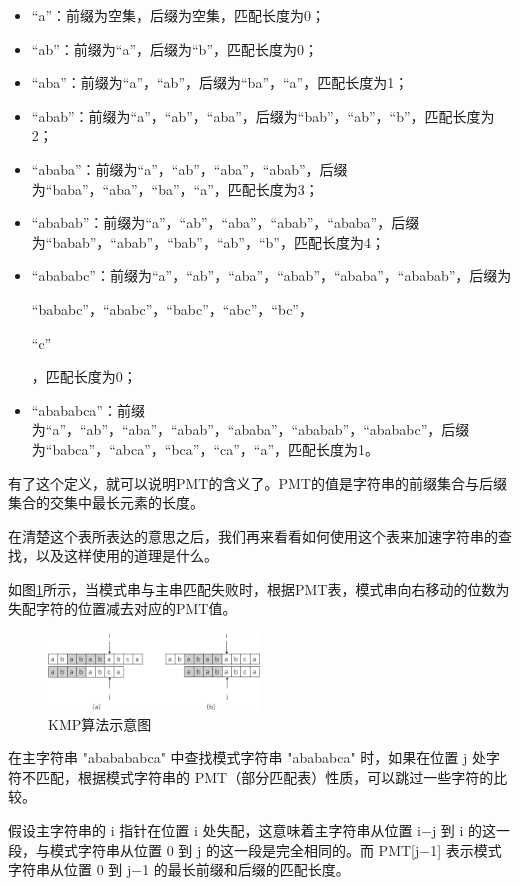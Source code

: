 \documentclass[lang=cn,newtx,10pt,scheme=chinese]{../elegantbook}
\begin{document}
\begin{itemize}
  \item “a”：前缀为空集，后缀为空集，匹配长度为0；
  \item “ab”：前缀为{“a”}，后缀为{“b”}，匹配长度为0；
  \item “aba”：前缀为{“a”，“ab”}，后缀为{“ba”，“a”}，匹配长度为1；
  \item “abab”：前缀为{“a”，“ab”，“aba”}，后缀为{“bab”，“ab”，“b”}，匹配长度为2；
  \item “ababa”：前缀为{“a”，“ab”，“aba”，“abab”}，后缀为{“baba”，“aba”，“ba”，“a”}，匹配长度为3；
  \item “ababab”：前缀为{“a”，“ab”，“aba”，“abab”，“ababa”}，后缀为{“babab”，“abab”，“bab”，“ab”，“b”}，匹配长度为4；
  \item “abababc”：前缀为{“a”，“ab”，“aba”，“abab”，“ababa”，“ababab”}，后缀为{“bababc”，“ababc”，“babc”，“abc”，“bc”，
  
  “c”}，匹配长度为0；
  \item “abababca”：前缀为{“a”，“ab”，“aba”，“abab”，“ababa”，“ababab”，“abababc”}，后缀为{“babca”，“abca”，“bca”，“ca”，“a”}，匹配长度为1。
\end{itemize}

有了这个定义，就可以说明PMT的含义了。PMT的值是字符串的前缀集合与后缀集合的交集中最长元素的长度。


在清楚这个表所表达的意思之后，我们再来看看如何使用这个表来加速字符串的查找，以及这样使用的道理是什么。

如图\ref{fig:KMP}所示，当模式串与主串匹配失败时，根据PMT表，模式串向右移动的位数为失配字符的位置减去对应的PMT值。

\begin{figure}[!htbp]
  \centering
  \includegraphics[width=0.5\textwidth]{./figure/pdf/cropped/KMP.pdf}
  \caption{KMP算法示意图}
  \label{fig:KMP}

\end{figure}

在主字符串 "ababababca" 中查找模式字符串 "abababca" 时，如果在位置 j 处字符不匹配，根据模式字符串的 PMT（部分匹配表）性质，可以跳过一些字符的比较。

假设主字符串的 i 指针在位置 i 处失配，这意味着主字符串从位置 i−j 到 i 的这一段，与模式字符串从位置 0 到 j 的这一段是完全相同的。而 PMT[j−1] 表示模式字符串从位置 0 到 j−1 的最长前缀和后缀的匹配长度。
\end{document}
